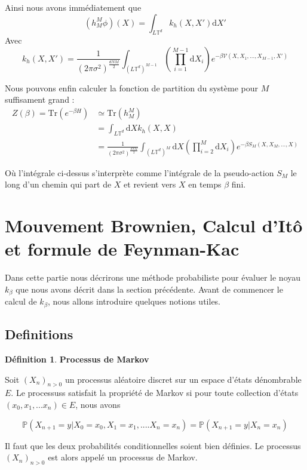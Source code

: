 \documentclass[11pt]{article}
\theoremstyle{definition}
\newtheorem{definition}{Définition}[section]
\theoremstyle{remark}
\newcommand{\dom}{L\mathbb{T}^d}
\begin{document}
Ainsi nous avons immédiatement que 
\begin{equation}
(h_M^M\phi)(X)=\int_{\dom}k_h(X,X')\mathrm{d}X'
\end{equation}
Avec 
\begin{equation}
k_h(X,X')=\frac{1}{(2\pi\sigma^2)^\frac{dNM}{2}}\int_{(\dom)^{M-1}} \left(\prod_{i=1}^{M-1}\mathrm{d}X_i\right) e^{-\beta \mathcal{V}(X,X_1,\ldots,X_{M-1},X')}
\end{equation}

Nous pouvons enfin calculer la fonction de partition du système pour $M$ suffisament grand :
\begin{align*}
Z(\beta)=\mathrm{Tr}(e^{-\beta H})& \simeq \mathrm{Tr}(h_M^M)
\\
&= \int_{\dom}\mathrm{d}X k_h(X,X)
\\
&= \frac{1}{(2\pi\sigma^2)^\frac{dNM}{2}}\int_{(\dom)^{M}} \mathrm{d}X\left(\prod_{i=2}^{M}\mathrm{d}X_i\right) e^{-\beta S_M(X,X_M,\ldots,X)}
\end{align*}

Où l'intégrale ci-dessus s'interprète comme l'intégrale de la pseudo-action $S_M$ le long d'un chemin qui part de $X$ et revient vers $X$ en temps $\beta$ fini.

\section{Mouvement Brownien, Calcul d'Itô et formule de Feynman-Kac}
Dans cette partie nous décrirons une méthode probabiliste pour évaluer le noyau $k_{\beta}$ que nous avons décrit dans la section précédente. 
Avant de commencer le calcul de $k_{\beta}$, nous allons introduire quelques notions utiles.

\subsection{Definitions}

\theoremstyle{definition}

\begin{definition}{\textbf{Processus de Markov}}

Soit $(X_n)_{n >0}$ un processus aléatoire discret sur un espace d'états dénombrable $E$. Le processuss satisfait la propriété de Markov si pour toute collection d'états $(x_0, x_1, ... x_n) \in E$, nous avons 

\begin{equation} 
\mathbb{P}(X_{n+1} = y | X_0 = x_0, X_1 = x_1,....X_n = x_n) = \mathbb{P}(X_{n+1} = y | X_n = x_n)
\end{equation}

Il faut que les deux probabilités conditionnelles soient bien définies. Le processus $(X_n)_{n>0} $ est alors appelé un processus de Markov.

\end{definition}
\end{document}
